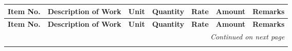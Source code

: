 \documentclass[12pt,a4paper]{article}
\begin{document}
\begin{longtable}{|p{1.2cm}|p{5.5cm}|p{1.2cm}|p{1.8cm}|p{1.8cm}|p{2.2cm}|p{1.8cm}|}
\hline
\rowcolor{lightgray}
\textbf{Item No.} & \textbf{Description of Work} & \textbf{Unit} & \textbf{Quantity} & \textbf{Rate} & \textbf{Amount} & \textbf{Remarks} \\
\hline
\endfirsthead

\hline
\rowcolor{lightgray}
\textbf{Item No.} & \textbf{Description of Work} & \textbf{Unit} & \textbf{Quantity} & \textbf{Rate} & \textbf{Amount} & \textbf{Remarks} \\
\hline
\endhead

\hline
\multicolumn{7}{|r|}{\textit{Continued on next page}} \\
\hline
\endfoot

\hline
\endlastfoot


\end{longtable}
\end{document}
